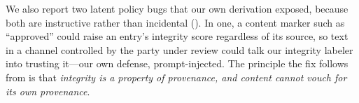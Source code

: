 We also report two latent policy bugs that our own derivation exposed, because
both are instructive rather than incidental (). In
one, a content marker such as ``approved'' could raise an entry's integrity
score regardless of its source, so text in a channel controlled by the party
under review could talk our integrity labeler into trusting it---our own
defense, prompt-injected. The principle the fix follows from is that
\emph{integrity is a property of provenance, and content cannot vouch for its
own provenance}.
